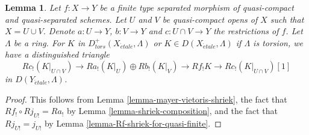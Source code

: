\documentclass{stacks-project}
\theoremstyle{plain}
\newtheorem{lemma}[subsection]{Lemma}
\theoremstyle{definition}
\theoremstyle{remark}
\numberwithin{equation}{subsection}
\def\etale{{\acute{e}tale}}
\begin{document}
\begin{lemma}
\label{lemma-relative-mayer-vietoris}
Let $f : X \to Y$ be a finite type separated morphism of quasi-compact and
quasi-separated schemes. Let $U$ and $V$ be quasi-compact opens of $X$
such that $X = U \cup V$. Denote $a : U \to Y$, $b : V \to Y$ and
$c : U \cap V \to Y$ the restrictions of $f$. Let $\Lambda$ be a ring.
For $K$ in $D^+_{tors}(X_\etale, \Lambda)$ or $K \in D(X_\etale, \Lambda)$
if $\Lambda$ is torsion, we have a distinguished triangle
$$
Rc_!(K|_{U \cap V}) \to
Ra_!(K|_U) \oplus Rb_!(K|_V) \to
Rf_!K \to 
Rc_!(K|_{U \cap V})[1]
$$
in $D(Y_\etale, \Lambda)$.
\end{lemma}

\begin{proof}
This follows from Lemma \ref{lemma-mayer-vietoris-shriek},
the fact that $Rf_! \circ Rj_{U!} = Ra_!$ by
Lemma \ref{lemma-shriek-composition}, and the fact that
$Rj_{U!} = j_{U!}$ by Lemma \ref{lemma-Rf-shriek-for-quasi-finite}.
\end{proof}
\end{document}
